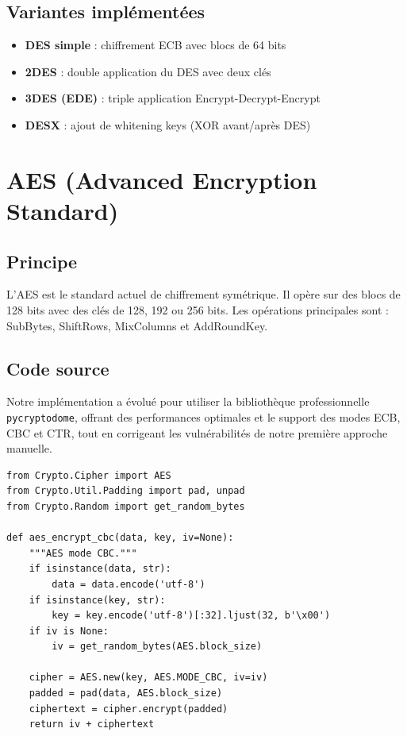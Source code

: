 \documentclass[12pt,a4paper]{report}
\begin{document}
\subsection{Variantes implémentées}
\begin{itemize}
    \item \textbf{DES simple} : chiffrement ECB avec blocs de 64 bits
    \item \textbf{2DES} : double application du DES avec deux clés
    \item \textbf{3DES (EDE)} : triple application Encrypt-Decrypt-Encrypt
    \item \textbf{DESX} : ajout de whitening keys (XOR avant/après DES)
\end{itemize}

\section{AES (Advanced Encryption Standard)}

\subsection{Principe}
L'AES est le standard actuel de chiffrement symétrique. Il opère sur des blocs de 128 bits avec des clés de 128, 192 ou 256 bits. Les opérations principales sont : SubBytes, ShiftRows, MixColumns et AddRoundKey.

\subsection{Code source}
Notre implémentation a évolué pour utiliser la bibliothèque professionnelle \texttt{pycryptodome}, offrant des performances optimales et le support des modes ECB, CBC et CTR, tout en corrigeant les vulnérabilités de notre première approche manuelle.

\begin{lstlisting}[style=python,caption=AES.py - Chiffrement CBC]
from Crypto.Cipher import AES
from Crypto.Util.Padding import pad, unpad
from Crypto.Random import get_random_bytes

def aes_encrypt_cbc(data, key, iv=None):
    """AES mode CBC."""
    if isinstance(data, str):
        data = data.encode('utf-8')
    if isinstance(key, str):
        key = key.encode('utf-8')[:32].ljust(32, b'\x00')
    if iv is None:
        iv = get_random_bytes(AES.block_size)

    cipher = AES.new(key, AES.MODE_CBC, iv=iv)
    padded = pad(data, AES.block_size)
    ciphertext = cipher.encrypt(padded)
    return iv + ciphertext
\end{lstlisting}
\end{document}
